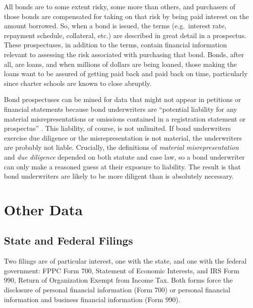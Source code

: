 All bonds are to some extent risky, some more than others, and purchasers of those bonds are compensated for taking on that risk by being paid interest on the amount borrowed. So, when a bond is issued, the terms (e.g. interest rate, repayment schedule, collateral, etc.) are described in great detail in a prospectus. These prospectuses, in addition to the terms, contain financial information relevant to assessing the risk associated with purchasing that bond. Bonds, after all, are loans, and when millions of dollars are being loaned, those making the loans want to be assured of getting paid back and paid back on time, particularly since charter schools are known to close abruptly.

Bond prospectuses can be mined for data that might not appear in petitions or financial statements because bond underwriters are ``potential liability for any material misrepresentations or omissions contained in a registration statement or prospectus'' \parencite{Block.etal2008}. This liability, of course, is not unlimited. If bond underwriters exercise due diligence or the misrepresentation is not material, the underwriters are probably not liable. Crucially, the definitions of \textit{material misrepresentation} and \textit{due diligence} depended on both statute and case law, so a bond underwriter can only make a reasoned guess at their exposure to liability. The result is that bond underwriters are likely to be more diligent than is absolutely necessary.

\section{Other Data}\label{other-data}\indent%

\subsection{State and Federal Filings}\label{sec:state-federal-filings}\indent%

Two filings are of particular interest, one with the state, and one with the federal government: FPPC Form 700, Statement of Economic Interests, and IRS Form 990, Return of Organization Exempt from Income Tax. Both forms force the disclosure of personal financial information (Form 700) or personal financial information and business financial information (Form 990). 

